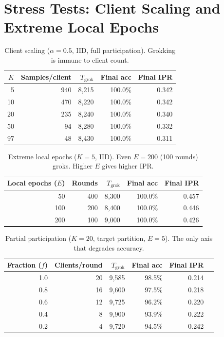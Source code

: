 \documentclass{article}
\begin{document}
\section{Stress Tests: Client Scaling and Extreme Local Epochs}
\label{app:stress}

\begin{table}[h]
\centering
\small
\caption{Client scaling ($\alpha{=}0.5$, IID, full participation). Grokking is immune to client count.}
\begin{tabular}{rrrrr}
\toprule
$K$ & Samples/client & $T_{\mathrm{grok}}$ & Final acc & Final IPR \\
\midrule
5   & 940 & 8{,}215 & 100.0\% & 0.342 \\
10  & 470 & 8{,}220 & 100.0\% & 0.342 \\
20  & 235 & 8{,}240 & 100.0\% & 0.340 \\
50  & 94  & 8{,}280 & 100.0\% & 0.332 \\
97  & 48  & 8{,}430 & 100.0\% & 0.311 \\
\bottomrule
\end{tabular}
\end{table}

\begin{table}[h]
\centering
\small
\caption{Extreme local epochs ($K{=}5$, IID). Even $E{=}200$ (100 rounds) groks. Higher $E$ gives higher IPR.}
\begin{tabular}{rrrrr}
\toprule
Local epochs ($E$) & Rounds & $T_{\mathrm{grok}}$ & Final acc & Final IPR \\
\midrule
50  & 400 & 8{,}300  & 100.0\% & 0.457 \\
100 & 200 & 8{,}400  & 100.0\% & 0.446 \\
200 & 100 & 9{,}000  & 100.0\% & 0.426 \\
\bottomrule
\end{tabular}
\end{table}

\begin{table}[h]
\centering
\small
\caption{Partial participation ($K{=}20$, target partition, $E{=}5$). The only axis that degrades accuracy.}
\begin{tabular}{rrrrrr}
\toprule
Fraction ($f$) & Clients/round & $T_{\mathrm{grok}}$ & Final acc & Final IPR \\
\midrule
1.0 & 20 & 9{,}585 & 98.5\% & 0.214 \\
0.8 & 16 & 9{,}600 & 97.5\% & 0.218 \\
0.6 & 12 & 9{,}725 & 96.2\% & 0.220 \\
0.4 &  8 & 9{,}900 & 93.9\% & 0.222 \\
0.2 &  4 & 9{,}720 & 94.5\% & 0.242 \\
\bottomrule
\end{tabular}
\end{table}
\end{document}
